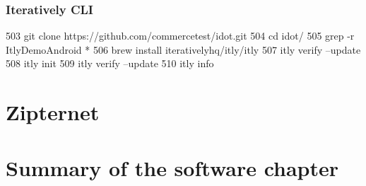 \subsubsection{Iteratively CLI}

  503  git clone https://github.com/commercetest/idot.git
  504  cd idot/
  505  grep -r ItlyDemoAndroid *
  506  brew install iterativelyhq/itly/itly
  507  itly verify --update
  508  itly init
  509  itly verify --update
  510  itly info


\section{Zipternet}


\section{Summary of the software chapter}